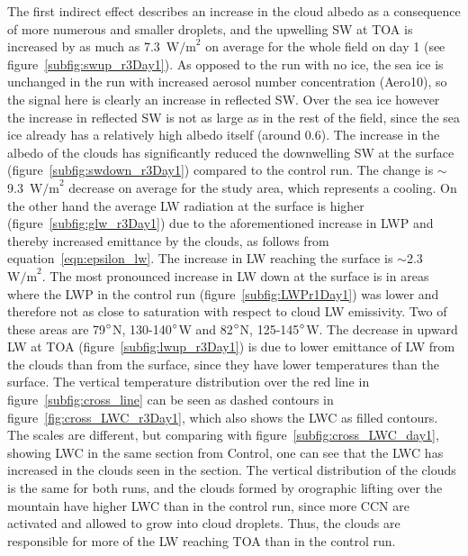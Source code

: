 The first indirect effect describes an increase in the cloud albedo as a consequence of more numerous and smaller droplets, and the upwelling SW at TOA is increased by as much as 7.3~$\text{W/m}^2$ on average for the whole field on day 1 (see figure~\ref{subfig:swup_r3Day1}). As opposed to the run with no ice, the sea ice is unchanged in the run with increased aerosol number concentration (Aero10), so the signal here is clearly an increase in reflected SW. Over the sea ice however the increase in reflected SW is not as large as in the rest of the field, since the sea ice already has a relatively high albedo itself (around 0.6). The increase in the albedo of the clouds has significantly reduced the downwelling SW at the surface (figure~\ref{subfig:swdown_r3Day1}) compared to the control run. The change is $\sim$9.3~$\text{W/m}^2$ decrease on average for the study area, which represents a cooling. On the other hand the average LW radiation at the surface is higher (figure~\ref{subfig:glw_r3Day1}) due to the aforementioned increase in LWP and thereby increased emittance by the clouds, as follows from equation~\ref{eqn:epsilon_lw}. The increase in LW reaching the surface is $\sim$2.3~$\text{W/m}^2$. The most pronounced increase in LW down at the surface is in areas where the LWP in the control run (figure~\ref{subfig:LWPr1Day1}) was lower and therefore not as close to saturation with respect to cloud LW emissivity. Two of these areas are 79$\degree$N, 130-140$\degree$W and 82$\degree$N, 125-145$\degree$W. The decrease in upward LW at TOA (figure~\ref{subfig:lwup_r3Day1}) is due to lower emittance of LW from the clouds than from the surface, since they have lower temperatures than the surface. The vertical temperature distribution over the red line in figure~\ref{subfig:cross_line} can be seen as dashed contours in figure~\ref{fig:cross_LWC_r3Day1}, which also shows the LWC as filled contours. The scales are different, but comparing with figure~\ref{subfig:cross_LWC_day1}, showing LWC in the same section from Control, one can see that the LWC has increased in the clouds seen in the section. The vertical distribution of the clouds is the same for both runs, and the clouds formed by orographic lifting over the mountain have higher LWC than in the control run, since more CCN are activated and allowed to grow into cloud droplets. Thus, the clouds are responsible for more of the LW reaching TOA than in the control run.

